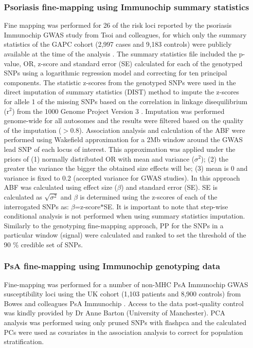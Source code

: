 \subsubsection{Psoriasis fine-mapping using Immunochip summary statistics}
Fine mapping was performed for 26 of the risk loci reported by the psoriasis Immunochip GWAS study from Tsoi and colleagues, for which only the summary statistics of the GAPC cohort (2,997 cases and 9,183 controls) were publicly available at the time of the analysis \parencite{Tsoi2012}. The summary statistics file included the p-value, OR, z-score and standard error (SE) calculated for each of the genotyped SNPs using a logarithmic regression model and correcting for ten principal components. The statistic z-scores from the genotyped SNPs were used in the direct imputation of summary statistics (DIST) method to impute the z-scores for allele 1 of the missing SNPs based on the correlation in linkage disequilibrium (r$^2$) from the 1000 Genome Project Version 3 \parencite{Lee2013}. Imputation was performed genome-wide for all autosomes and the results were filtered based on the quality of the imputation ($>$0.8). Association analysis and calculation of the ABF were performed using Wakefield approximation for a 2Mb window around the GWAS lead SNP of each locus of interest. This approximation was applied under the priors of (1) normally distributed OR with mean and variance ($\sigma^2$); (2) the greater the variance the bigger the obtained size effects will be; (3) mean is 0 and variance is fixed to 0.2 (accepted variance for GWAS studies). In this approach ABF was calculated using effect size ($\beta$) and standard error (SE). SE is calculated as $\sqrt{\sigma^2}$ and $\beta$ is determined using the z-scores of each of the interrogated SNPs as: $\beta$=z-score$\ast$SE. It is important to note that step-wise conditional analysis is not performed when using summary statistics imputation. Similarly to the genotyping fine-mapping approach, PP for the SNPs in a particular window (signal) were calculated and ranked to set the threshold of the 90 \% credible set of SNPs. 

\subsubsection{PsA fine-mapping using Immunochip genotyping data}
Fine-mapping was performed for a number of non-MHC PsA Immunochip GWAS susceptibility loci using the UK cohort (1,103 patients and 8,900 controls) from Bowes and colleagues PsA Immunochip \parencite{Bowes2015}. Access to the data post-quality control was kindly provided by Dr Anne Barton (University of Manchester). PCA analysis was performed using only pruned SNPs with flashpca \parencite{Abraham2014} and the calculated PCs were used as covariates in the association analysis to correct for population stratification. 

